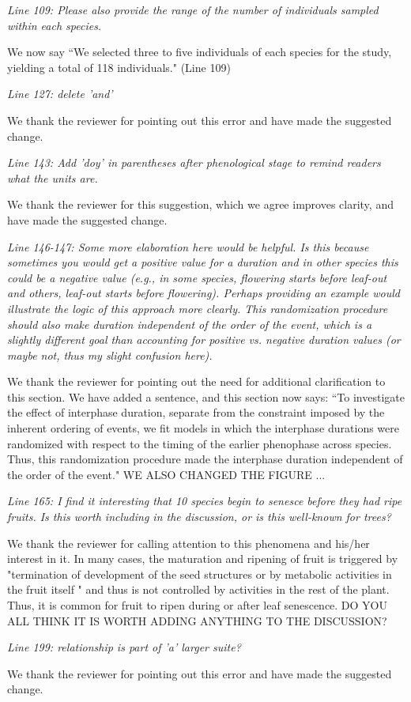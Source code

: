 \documentclass[10.95pt,a4paper]{letter}
\begin{document}
\par \emph{Line 109: Please also provide the range of the number of individuals sampled within each species. } 
\par We now say ``We selected three to five individuals of each species for the study, yielding a total of 118 individuals." (Line 109)

\par \emph{Line 127: delete 'and'}
\par We thank the reviewer for pointing out this error and have made the suggested change. 

\par \emph{Line 143: Add 'doy' in parentheses after phenological stage to remind readers what the units are.} 
\par We thank the reviewer for this suggestion, which we agree improves clarity, and have made the suggested change. 

\par \emph{Line 146-147: Some more elaboration here would be helpful.  Is this because sometimes you would get a positive value for a duration and in other species this could be a negative value (e.g., in some species, flowering starts before leaf-out and others, leaf-out starts before flowering).  Perhaps providing an example would illustrate the logic of this approach more clearly.  This randomization procedure should also make duration independent of the order of the event, which is a slightly different goal than accounting for positive vs. negative duration values (or maybe not, thus my slight confusion here).}
\par We thank the reviewer for pointing out the need for additional clarification to this section. We have added a sentence, and this section now says:
``To investigate the effect of interphase duration, separate from the constraint imposed by the inherent ordering of events, we fit models in which the interphase durations were randomized with respect to the timing of the earlier phenophase across species. Thus, this randomization procedure made the interphase duration independent of the order of the event." WE ALSO CHANGED THE FIGURE ...
\par \emph{Line 165: I find it interesting that 10 species begin to senesce before they had ripe fruits. Is this worth including in the discussion, or is this well-known for trees?} 
\par We thank the reviewer for calling attention to this phenomena and his/her interest in it. In many cases, the maturation and ripening of fruit is triggered by "termination of development of the seed structures or by metabolic activities in the fruit itself " and thus is not controlled by activities in the rest of the plant. Thus, it is common for fruit to ripen during or after leaf senescence. DO YOU ALL THINK IT  IS WORTH ADDING ANYTHING TO THE DISCUSSION?
\par \emph{Line 199: relationship is part of 'a' larger suite?}
\par We thank the reviewer for pointing out this error and have made the suggested change. 
\end{document}
